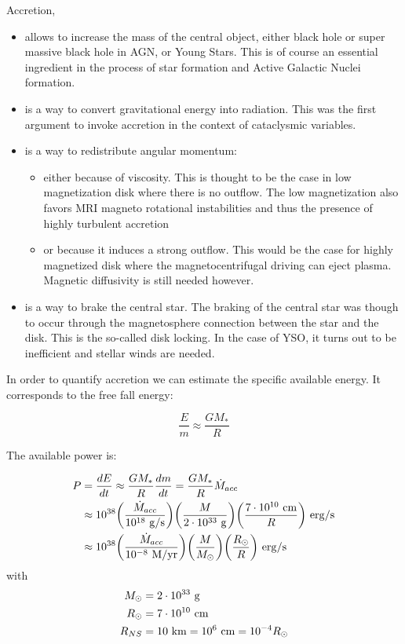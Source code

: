 \documentclass[10pt,a4paper,english]{article}
\let\originalleft\left
\let\originalright\right
\renewcommand{\left}{\mathopen{}\mathclose\bgroup\originalleft}
\renewcommand{\right}{\aftergroup\egroup\originalright}
\begin{document}
Accretion,
\begin{itemize}
    \item allows to increase the mass of the central object, either black hole
          or super massive black hole in AGN, or Young Stars. This is of course
          an essential ingredient in the process of star formation and Active
          Galactic Nuclei formation.
    \item is a way to convert gravitational energy into radiation. This was the
          first argument to invoke accretion in the context of cataclysmic
          variables.
    \item is a way to redistribute angular momentum:
          \begin{itemize}
              \item either because of viscosity. This is thought to be the case
                    in low magnetization disk where there is no outflow. The
                    low magnetization also favors MRI magneto rotational
                    instabilities and thus the presence of highly turbulent
                    accretion
              \item or because it induces a strong outflow. This would be the
                    case for highly magnetized disk where the
                    magnetocentrifugal driving can eject plasma. Magnetic
                    diffusivity is still needed however.
          \end{itemize}
    \item is a way to brake the central star. The braking of the central star
          was though to occur through the magnetosphere connection between the
          star and the disk. This is the so-called disk locking. In the case of
          YSO, it turns out to be inefficient and stellar winds are needed.
\end{itemize}

In order to quantify accretion we can estimate the specific available energy.
It corresponds to the free fall energy:

\begin{equation}
  \frac{E}{m} \approx \frac{GM_*}{R}
\end{equation}

The available power is:

\begin{align} 
P & = \frac{dE}{dt} \approx \frac{GM_*}{R} \frac{dm}{dt} = \frac{GM_*}{R} \dot{M}_{acc}
    \\  
    &\approx 10^{38} \left(\frac{\dot{M}_{acc}}{10^{18} \un{g/s}}\right) \left(\frac{M}{2\E{33}\un{g}}\right) \left(\frac{7\E{10}\un{cm}}{R}\right) \un{erg/s}
    \\    
    &\approx 10^{38} \left(\frac{\dot{M}_{acc}}{10^{-8} \un{M/yr}}\right) \left(\frac{M}{M_{\odot}}\right) \left(\frac{R_{\odot}}{R}\right) \un{erg/s}
\end{align}
with
\begin{align}
  M_{\odot} &= 2 \cdot 10^{33}\ \mathrm{g} \\
  R_{\odot} &= 7 \cdot 10^{10}\ \mathrm{cm} \\
  R_{NS}   &= 10 \ \mathrm{km} = 10^{6} \ \mathrm{cm} = 10^{-4} R_{\odot}
\end{align}
\end{document}
